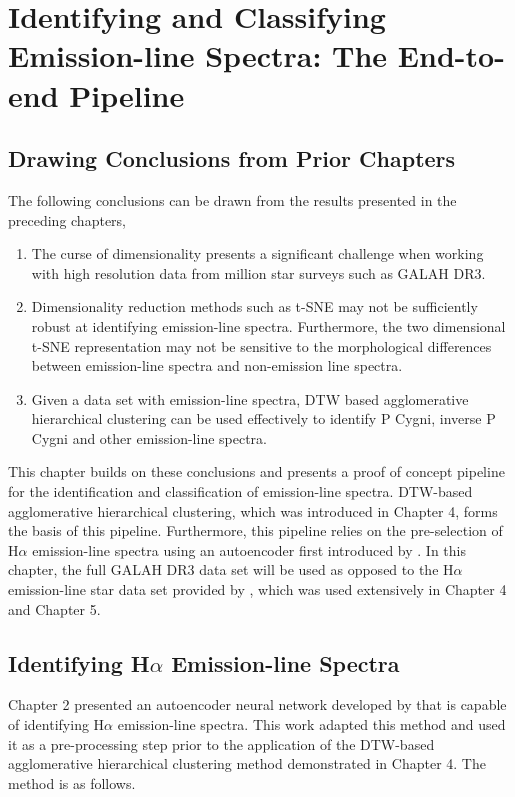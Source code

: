 \chapter{Identifying and Classifying Emission-line Spectra: The End-to-end Pipeline}

\section{Drawing Conclusions from Prior Chapters}

The following conclusions can be drawn from the results presented in the preceding chapters,

\begin{enumerate}
    \item The curse of dimensionality presents a significant challenge when working with high resolution data from million star surveys such as GALAH DR3. 
    \item Dimensionality reduction methods such as t-SNE may not be sufficiently robust at identifying emission-line spectra. Furthermore, the two dimensional t-SNE representation may not be sensitive to the morphological differences between emission-line spectra and non-emission line spectra.
    \item Given a data set with emission-line spectra, DTW based agglomerative hierarchical clustering can be used effectively to identify P Cygni, inverse P Cygni and other emission-line spectra.
\end{enumerate}

This chapter builds on these conclusions and presents a proof of concept pipeline for the identification and classification of emission-line spectra. DTW-based agglomerative hierarchical clustering, which  was introduced in Chapter 4, forms the basis of this pipeline. Furthermore, this pipeline relies on the pre-selection of H$\alpha$ emission-line spectra using an autoencoder first introduced by \citet{vcotar2021galah}. In this chapter, the full GALAH DR3 data set will be used as opposed to the H$\alpha$ emission-line star data set provided by \citet{vcotar2021galah}, which was used extensively in Chapter 4 and Chapter 5.

\section{Identifying H$\alpha$ Emission-line Spectra}

Chapter 2 presented an autoencoder neural network developed by \citet{vcotar2021galah} that is capable of identifying H$\alpha$ emission-line spectra. This work adapted this method and used it as a pre-processing step prior to the application of the DTW-based agglomerative hierarchical clustering method demonstrated in Chapter 4. The method is as follows.

